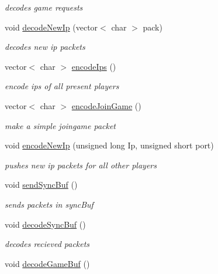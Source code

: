 \begin{DoxyCompactItemize}
\begin{DoxyCompactList}\small\item\em decodes game requests \end{DoxyCompactList}\item 
void \hyperlink{class_network_a6355166cc92ae92d3733d2f473abcc3a}{decode\+New\+Ip} (vector$<$ char $>$ pack)
\begin{DoxyCompactList}\small\item\em decodes new ip packets \end{DoxyCompactList}\item 
vector$<$ char $>$ \hyperlink{class_network_af56c81957d00bac67095c1788b50c9e9}{encode\+Ips} ()
\begin{DoxyCompactList}\small\item\em encode ips of all present players \end{DoxyCompactList}\item 
vector$<$ char $>$ \hyperlink{class_network_a3661dd702ec900bf055161d50230014d}{encode\+Join\+Game} ()
\begin{DoxyCompactList}\small\item\em make a simple joingame packet \end{DoxyCompactList}\item 
void \hyperlink{class_network_a3261dcafabc7cc28b8e05e8141ad559a}{encode\+New\+Ip} (unsigned long Ip, unsigned short port)
\begin{DoxyCompactList}\small\item\em pushes new ip packets for all other players \end{DoxyCompactList}\item 
\hypertarget{class_network_a7a7cc6268a789bb259f7fa125885a5f4}{void \hyperlink{class_network_a7a7cc6268a789bb259f7fa125885a5f4}{send\+Sync\+Buf} ()}\label{class_network_a7a7cc6268a789bb259f7fa125885a5f4}

\begin{DoxyCompactList}\small\item\em sends packets in sync\+Buf \end{DoxyCompactList}\item 
\hypertarget{class_network_a0e68820722c65d913f7c5c85c6154fe6}{void \hyperlink{class_network_a0e68820722c65d913f7c5c85c6154fe6}{decode\+Sync\+Buf} ()}\label{class_network_a0e68820722c65d913f7c5c85c6154fe6}

\begin{DoxyCompactList}\small\item\em decodes recieved packets \end{DoxyCompactList}\item 
\hypertarget{class_network_a2a38439b09a7caf647359b0dca311fdc}{void \hyperlink{class_network_a2a38439b09a7caf647359b0dca311fdc}{decode\+Game\+Buf} ()}\label{class_network_a2a38439b09a7caf647359b0dca311fdc}


\end{DoxyCompactItemize}
